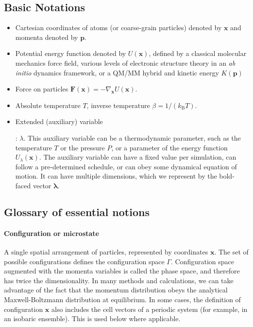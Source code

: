 \documentclass[9pt,review]{livecoms}
\newcommand{\vx}{\mathbf{x}}
\newcommand{\vp}{\mathbf{p}}
\newcommand{\vF}{\mathbf{F}}
\begin{document}
\subsection{Basic Notations}
\label{sec:Notation}
\begin{itemize}
\item Cartesian coordinates of atoms (or coarse-grain particles) denoted by $\vx$ and momenta denoted by $\vp$.
\item Potential energy function denoted by $U(\vx)$, defined by a classical molecular mechanics force field, various levels of electronic structure theory in an \emph{ab initio} dynamics framework, or a QM/MM hybrid and kinetic energy $K(\vp)$
\item Force on particles $\vF(\vx) = -\nabla_\vx U(\vx)$.
\item Absolute temperature $T$, inverse temperature $\beta = 1/(k_\mathrm{B} T)$.
\item \hypertarget{ref:AuxVar} {Extended (auxiliary) variable}: $\lambda$. This auxiliary variable can be a thermodynamic parameter, such as the temperature $T$ or the pressure $P$, or a parameter of the energy function $U_\lambda(\vx)$. The auxiliary variable can have a fixed value per simulation, can follow a pre-determined schedule, or can obey some dynamical equation of motion. It can have multiple dimensions, which we represent by the bold-faced vector $\boldsymbol{\lambda}$.

\end{itemize}

\subsection{Glossary of essential notions}
\label{sec:glossary}

\hypertarget{ref:Microstate} {\paragraph{Configuration or microstate}}
A single spatial arrangement of particles, represented by coordinates $\vx$. The set of possible configurations defines the configuration space $\Gamma$.
Configuration space augmented with the momenta variables is called the phase space, and therefore has twice the dimensionality. In many methods and calculations, we can take advantage of the fact that the momentum distribution obeys the analytical Maxwell-Boltzmann distribution at equilibrium.
In some cases, the  definition of configuration $\vx$ also includes the cell vectors of a periodic system (for example, in an isobaric ensemble).  This is used below where applicable.
\end{document}
